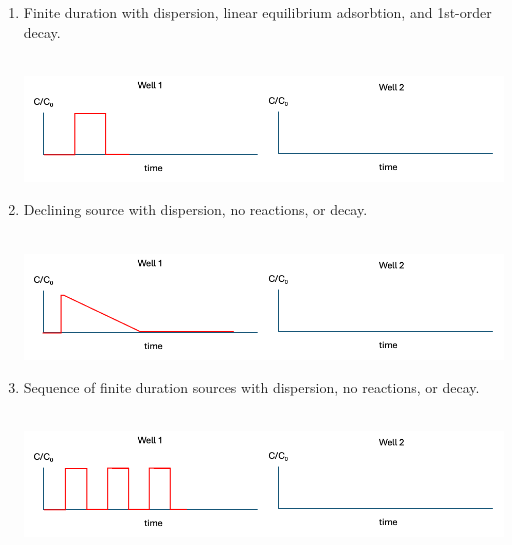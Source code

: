 \documentclass[12pt]{article}
\begin{document}
\begin{enumerate}
\begin{enumerate}
\begin{center}
\end{center}
\item Finite duration with dispersion, linear equilibrium adsorbtion, and 1st-order decay. ~\\~\\
\begin{center}
\includegraphics[width=6in]{PulseHistory.png} 
\end{center}
\clearpage %
\item Declining source with dispersion, no reactions, or decay. ~\\~\\
\begin{center}
\includegraphics[width=6in]{DeclineHistory.png} 
\end{center}
\item Sequence of finite duration sources with dispersion, no reactions, or decay. ~\\~\\
\begin{center}
\includegraphics[width=6in]{SequenceHistory.png} 
\end{center}
\end{enumerate}

\end{enumerate}
\end{document}
